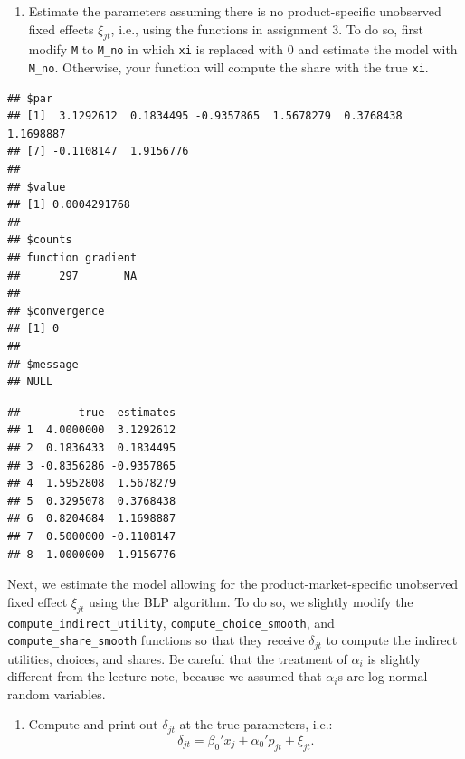 \documentclass[]{book}
\newenvironment{Shaded}{\begin{snugshade}}{\end{snugshade}}
\newcommand{\KeywordTok}[1]{\textcolor[rgb]{0.13,0.29,0.53}{\textbf{#1}}}
\newcommand{\DataTypeTok}[1]{\textcolor[rgb]{0.13,0.29,0.53}{#1}}
\newcommand{\DecValTok}[1]{\textcolor[rgb]{0.00,0.00,0.81}{#1}}
\newcommand{\StringTok}[1]{\textcolor[rgb]{0.31,0.60,0.02}{#1}}
\newcommand{\OperatorTok}[1]{\textcolor[rgb]{0.81,0.36,0.00}{\textbf{#1}}}
\newcommand{\NormalTok}[1]{#1}
\providecommand{\tightlist}{%
  \setlength{\itemsep}{0pt}\setlength{\parskip}{0pt}}
\begin{document}
\begin{enumerate}
\def\labelenumi{\arabic{enumi}.}
\setcounter{enumi}{2}
\tightlist
\item
  Estimate the parameters assuming there is no product-specific
  unobserved fixed effects \(\xi_{jt}\), i.e., using the functions in
  assignment 3. To do so, first modify \texttt{M} to \texttt{M\_no} in
  which \texttt{xi} is replaced with 0 and estimate the model with
  \texttt{M\_no}. Otherwise, your function will compute the share with
  the true \texttt{xi}.
\end{enumerate}

\begin{Shaded}
\end{Shaded}

\begin{verbatim}
## $par
## [1]  3.1292612  0.1834495 -0.9357865  1.5678279  0.3768438  1.1698887
## [7] -0.1108147  1.9156776
## 
## $value
## [1] 0.0004291768
## 
## $counts
## function gradient 
##      297       NA 
## 
## $convergence
## [1] 0
## 
## $message
## NULL
\end{verbatim}

\begin{verbatim}
##         true  estimates
## 1  4.0000000  3.1292612
## 2  0.1836433  0.1834495
## 3 -0.8356286 -0.9357865
## 4  1.5952808  1.5678279
## 5  0.3295078  0.3768438
## 6  0.8204684  1.1698887
## 7  0.5000000 -0.1108147
## 8  1.0000000  1.9156776
\end{verbatim}

Next, we estimate the model allowing for the product-market-specific
unobserved fixed effect \(\xi_{jt}\) using the BLP algorithm. To do so,
we slightly modify the \texttt{compute\_indirect\_utility},
\texttt{compute\_choice\_smooth}, and \texttt{compute\_share\_smooth}
functions so that they receive \(\delta_{jt}\) to compute the indirect
utilities, choices, and shares. Be careful that the treatment of
\(\alpha_i\) is slightly different from the lecture note, because we
assumed that \(\alpha_i\)s are log-normal random variables.

\begin{enumerate}
\def\labelenumi{\arabic{enumi}.}
\setcounter{enumi}{3}
\tightlist
\item
  Compute and print out \(\delta_{jt}\) at the true parameters, i.e.: \[
  \delta_{jt} = \beta_0' x_j + \alpha_0' p_{jt} + \xi_{jt}.
  \]
\end{enumerate}
\end{document}
